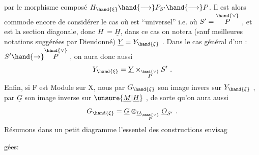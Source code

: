 
par le morphisme composé $H_{\hand{\xi}} \hand{\longrightarrow} P_{S'} \hand{\longrightarrow} P$. Il est alors commode
 encore de considérer le cas où \hand{$\xi$} est
``universel'' i.e. où $S' = \overset{\hand{\vee}}{P}$ , et \hand{$\xi$} est la section diagonale, donc $H \ = \underline{H}$,
dans ce cas on notera (sauf meilleures notations suggérées par Dieudonné)
$\underline{Y} = Y_{\hand{\xi}}$ . Dans le cas général d'un \hand{$\xi$}: $S' \hand{\to} \overset{\hand{\vee}}{P}$ , on aura donc aussi
\[ Y_{\hand{\xi}} = \underline{Y} \times_{\overset{\hand{\vee}}{P}} S' \ . \]
Enfin, si F est Module sur X, nous  par $G_{\hand{\xi}}$ son image invers
sur $Y_{\hand{\xi}}$ , par $\underline{G}$ son image inverse sur $\unsure{\underline{M}|\underline{H}}$ , de sorte qu'on aura aussi
\[ G_{\hand{\xi}} = \underline{G} \otimes_{\underline{O}_{\overset{\hand{\vee}}{P}}} \underline{O}_{S'} \ . \]
Résumons dans un petit diagramme l'essentel des constructions  envisag

gées:

